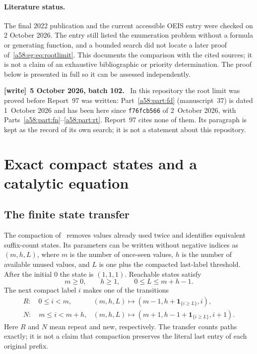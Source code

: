 \documentclass[11pt,letterpaper]{article}
\theoremstyle{remark}
\newcommand{\ind}[1]{\mathbf1_{\{#1\}}}
\newenvironment{writenote}[1][]{\par\smallskip\begingroup\small
 \noindent\textbf{[write]}\if\relax\detokenize{#1}\relax\else~\textbf{#1.}\fi\ }%
 {\par\endgroup\smallskip}
\begin{document}
\paragraph{Literature status.}
The final 2022 publication and the current accessible OEIS entry were checked on 2 October 2026. The entry still listed the enumeration problem without a formula or generating function, and a bounded search did not locate a later proof of~\eqref{a58:eg:eq:rootlimit}. This documents the comparison with the cited sources; it is not a claim of an exhaustive bibliographic or priority determination. The proof below is presented in full so it can be assessed independently.

\begin{writenote}[5 October 2026, batch 102]
In this repository the root limit was proved before Report~97 was written: Part~\ref{a58:part:fd} (manuscript~37) is dated 1~October 2026 and has been here since \texttt{f76fcb566} of 2~October 2026, with Parts~\ref{a58:part:fn}--\ref{a58:part:rt}. Report~97 cites none of them. Its paragraph is kept as the record of its own search; it is not a statement about this repository.
\end{writenote}

\section{Exact compact states and a catalytic equation}\label{a58:eg:sec:kernel}
\subsection{The finite state transfer}
The compaction of~\cite[Sections 2.2 and 2.6]{CCEG} removes values already used twice and identifies equivalent suffix-count states. Its parameters can be written without negative indices as $(m,h,L)$, where $m$ is the number of once-seen values, $h$ is the number of available unused values, and $L$ is one plus the compacted last-label threshold. After the initial 0 the state is $(1,1,1)$. Reachable states satisfy
\[
 m\ge0,\qquad h\ge1,\qquad0\le L\le m+h-1.
\]
The next compact label $i$ makes one of the transitions
\begin{align}
 R:\quad 0\le i<m,
 &(m,h,L)\longmapsto(m-1,h+\ind{i\ge L},i),\label{a58:eg:eq:repeat}\\
 N:\quad m\le i<m+h,
 &(m,h,L)\longmapsto(m+1,h-1+\ind{i\ge L},i+1).\label{a58:eg:eq:new}
\end{align}
Here $R$ and $N$ mean repeat and new, respectively. The transfer counts paths exactly; it is not a claim that compaction preserves the literal last entry of each original prefix.
\end{document}
